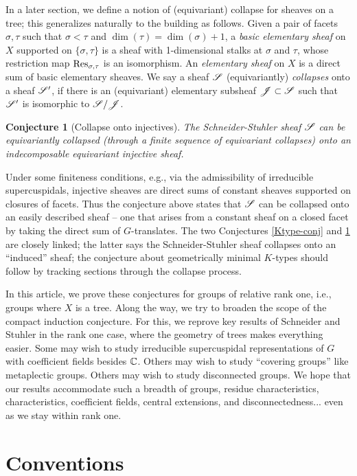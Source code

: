 \documentclass[letter]{amsart}
\newtheorem{conj}[thm]{Conjecture}
\theoremstyle{definition}
\theoremstyle{remark}
\numberwithin{thm}{section}
\numberwithin{equation}{section}
\begin{document}
In a later section, we define a notion of (equivariant) collapse for sheaves on a tree; this generalizes naturally to the building as follows.  Given a pair of facets $\sigma, \tau$ such that $\sigma < \tau$ and $\dim(\tau) = \dim(\sigma) + 1$, a {\em basic elementary sheaf} on $X$ supported on $\{ \sigma, \tau \}$ is a sheaf with 1-dimensional stalks at $\sigma$ and $\tau$, whose restriction map $\operatorname{Res}_{\sigma, \tau}$ is an isomorphism.  An {\em elementary sheaf} on $X$ is a direct sum of basic elementary sheaves.  We say a sheaf ${\mathscr{S}}$ (equivariantly) {\em collapses} onto a sheaf ${\mathscr{S}}'$, if there is an (equivariant) elementary subsheaf ${\mathscr{J}} \subset {\mathscr{S}}$ such that ${\mathscr{S}}'$ is isomorphic to ${\mathscr{S}} / {\mathscr{J}}$.  
\begin{conj}[Collapse onto injectives]
\label{coll-conj}
The Schneider-Stuhler sheaf ${\mathscr{S}}$ can be equivariantly collapsed (through a finite sequence of equivariant collapses) onto an indecomposable equivariant {\em injective} sheaf.
\end{conj}
Under some finiteness conditions, e.g., via the admissibility of irreducible supercuspidals, injective sheaves are direct sums of constant sheaves supported on closures of facets.  Thus the conjecture above states that ${\mathscr{S}}$ can be collapsed onto an easily described sheaf -- one that arises from a constant sheaf on a closed facet by taking the direct sum of $G$-translates.  The two Conjectures \ref{Ktype-conj} and \ref{coll-conj} are closely linked; the latter says the Schneider-Stuhler sheaf collapses onto an ``induced'' sheaf; the conjecture about geometrically minimal $K$-types should follow by tracking sections through the collapse process.  

\medskip
In this article, we prove these conjectures for groups of relative rank one, i.e., groups where $X$ is a tree.  Along the way, we try to broaden the scope of the compact induction conjecture.  For this, we reprove key results of Schneider and Stuhler in the rank one case, where the geometry of trees makes everything easier.  Some may wish to study irreducible supercuspidal representations of $G$ with coefficient fields besides $\mathbb C$.  Others may wish to study ``covering groups'' like metaplectic groups.  Others may wish to study disconnected groups.  We hope that our results accommodate such a breadth of groups, residue characteristics, characteristics, coefficient fields, central extensions, and disconnectedness... even as we stay within rank one.

\section{Conventions}
\end{document}
